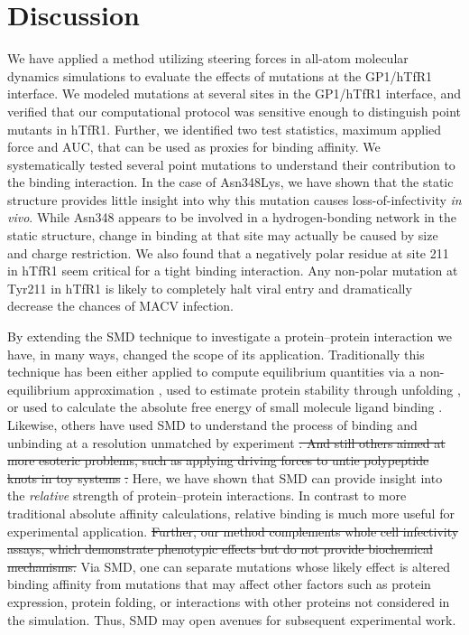 \documentclass[12pt]{article} %
\providecommand{\DIFadd}[1]{{\protect\color{blue}\uwave{#1}}} %
\providecommand{\DIFdel}[1]{{\protect\color{red}\sout{#1}}}                      %
\providecommand{\DIFaddbegin}{} %
\providecommand{\DIFaddend}{} %
\providecommand{\DIFdelbegin}{} %
\providecommand{\DIFdelend}{} %
\begin{document}
\section{Discussion}

We have applied a method utilizing steering forces in all-atom molecular dynamics simulations to evaluate the effects of mutations at the GP1/hTfR1 interface. We modeled mutations at several sites in the GP1/hTfR1 interface, and verified that our computational protocol was sensitive enough to distinguish point mutants in hTfR1. Further, we identified two test statistics, maximum applied force and AUC, that can be used as proxies for binding affinity. We systematically tested several point mutations to understand their contribution to the binding interaction. In the case of Asn348Lys, we have shown that the static structure provides little insight into why this mutation causes loss-of-infectivity \textit{in vivo}. While Asn348 appears to be involved in a hydrogen-bonding network in the static structure, change in binding at that site may actually be caused by size and charge restriction. We also found that a negatively polar residue at site 211 in hTfR1 seem critical for a tight binding interaction. Any non-polar mutation at Tyr211 in hTfR1 is likely to completely halt viral entry and dramatically decrease the chances of MACV infection.

By extending the SMD technique to investigate a protein--protein interaction we have, in many ways, changed the scope of its application. Traditionally this technique has been either applied to compute equilibrium quantities via a non-equilibrium approximation \DIFdelbegin %
\DIFdelend \DIFaddbegin \citep{Park2003,Park2004,Giorgino2011}\DIFaddend , used to estimate protein stability through unfolding \DIFdelbegin %
\DIFdelend \DIFaddbegin \citep{Lu1999}\DIFaddend , or used to calculate the absolute free energy of small molecule ligand binding \DIFdelbegin %
\DIFdelend \DIFaddbegin \citep{Dixit2001}\DIFaddend . Likewise, others have used SMD to understand the process of binding and unbinding at a resolution unmatched by experiment \DIFdelbegin %
\DIFdel{. And still others aimed at more esoteric problems, such as applying driving forces to untie polypeptide knots in toy systems }%
\DIFdel{. }\DIFdelend \DIFaddbegin \citep{Cuendet2011,Giorgino2011}\DIFadd{. }\DIFaddend Here, we have shown that SMD can provide insight into the \textit{relative} strength of protein--protein interactions. In contrast to more traditional absolute affinity calculations, relative binding is much more useful for experimental application. \DIFdelbegin \DIFdel{Further, our method complements whole cell infectivity assays, which demonstrate phenotypic effects but do not provide biochemical mechanisms. }\DIFdelend Via SMD, one can separate mutations whose likely effect is altered binding affinity from mutations that may affect other factors such as protein expression, protein folding, or interactions with other proteins not considered in the simulation. Thus, SMD may open avenues for subsequent experimental work.
\end{document}
